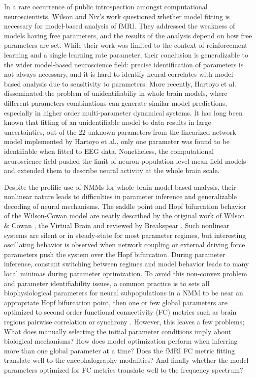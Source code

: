 In a rare occurrence of public introspection amongst computational neuroscientists, Wilson and Niv's work \cite{wilson_is_2015} questioned whether model fitting is necessary for model-based analysis of fMRI. They addressed the weakness of models having free parameters, and the results of the analysis depend on how free parameters are set. While their work was limited to the context of reinforcement learning and a single learning rate parameter, their conclusion is generalizable to the wider model-based neuroscience field: precise identification of parameters is not always necessary, and it is hard to identify neural correlates with model-based analysis due to sensitivity to parameters. More recently, Hartoyo et al. \cite{hartoyo_parameter_2019} disseminated the problem of unidentifiabiliy in whole brain models, where different parameters combinations can generate similar model predictions, especially in higher order multi-parameter dynamical systems. It has long been known that fitting of an unidentifiable model to data results in large uncertainties, out of the 22 unknown parameters from the linearized network model implemented by Hartoyo et al., only one parameter was found to be identifiable when fitted to EEG data. Nonetheless, the computational neuroscience field pushed the limit of neuron population level mean field models and extended them to describe neural activity at the whole brain scale.

Despite the prolific use of NMMs for whole brain model-based analysis, their nonlinear nature leads to difficulties in parameter inference and generalizable decoding of neural mechanisms. The saddle point and Hopf bifurcation behavior of the Wilson-Cowan model are neatly described by the original work of Wilson \& Cowan \cite{Wilson1972}, the Virtual Brain \cite{sanz-leon_mathematical_2015} and reviewed by Breakspear \cite{breakspear_dynamic_2017}. Such nonlinear systems are silent or in steady-state for most parameter regimes, but interesting oscillating behavior is observed when network coupling or external driving force parameters push the system over the Hopf bifurcation. During parameter inference, constant switching between regimes and model behavior leads to many local minimas during parameter optimization. To avoid this non-convex problem and parameter identifiability issues, a common practice is to sets all biophysiological parameters for neural subpopulations in a NMM to be near an appropriate Hopf bifurcation point, then one or few global parameters are optimized to second order functional connectivity (FC) metrics such as brain regions pairwise correlation or synchrony \cite{Zimmermann2018, Deco2009, abeysuriya_biophysical_2018, wang_inversion_2019, demirtas_hierarchical_2019, honey_predicting_2009}. However, this leaves a few problems; What does manually selecting the initial parameter conditions imply about biological mechanisms? How does model optimization perform when inferring more than one global parameter at a time? Does the fMRI FC metric fitting translate well to the encephalography modalities? And finally whether the model parameters optimized for FC metrics translate well to the frequency spectrum?

